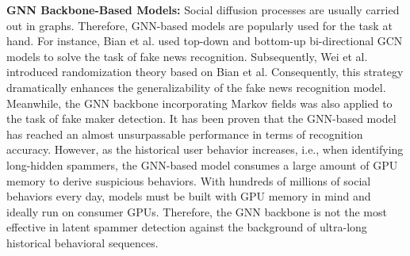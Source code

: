 \par \textbf{GNN Backbone-Based Models:} Social diffusion processes are usually carried out in graphs. Therefore, GNN-based models are popularly used for the task at hand. For instance, Bian et al.\cite{Bian2020Rumor} used top-down and bottom-up bi-directional GCN models to solve the task of fake news recognition. Subsequently, Wei et al.\cite{wei2024modeling} introduced randomization theory based on Bian et al. Consequently, this strategy dramatically enhances the generalizability of the fake news recognition model. Meanwhile, the GNN backbone incorporating Markov fields\cite{deng2023markov} was also applied to the task of fake maker detection. It has been proven that the GNN-based model has reached an almost unsurpassable performance in terms of recognition accuracy. However, as the historical user behavior increases, i.e., when identifying long-hidden spammers, the GNN-based model consumes a large amount of GPU memory to derive suspicious behaviors. With hundreds of millions of social behaviors every day, models must be built with GPU memory in mind and ideally run on consumer GPUs. Therefore, the GNN backbone is not the most effective in latent spammer detection against the background of ultra-long historical behavioral sequences.
